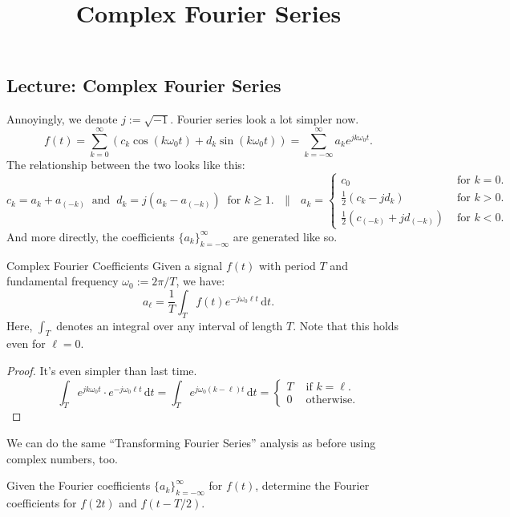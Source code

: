 \title{Complex Fourier Series}



\subsection{Lecture: Complex Fourier Series}

Annoyingly, we denote $j := \sqrt{-1}$.  Fourier series look a lot simpler now.
\[ f(t) = \sum_{k = 0}^{\infty} \left( c_k \cos(k \omega_0 t) + d_k \sin(k \omega_0 t) \right)
= \sum_{k = -\infty}^{\infty} a_k e^{j k \omega_0t}. \]
The relationship between the two looks like this:
\[ c_k = a_k + a_{(-k)} ~ \text{ and } ~ d_k = j\left(a_k - a_{(-k)}\right) ~ \text{ for } k \geq 1. ~~~ \parallel ~~~
a_k = \begin{cases}
c_0 & \text{ for } k = 0. \\
\frac{1}{2}(c_k - jd_k) & \text{ for } k > 0. \\
\frac{1}{2}(c_{(-k)} + jd_{(-k)}) & \text{ for } k < 0.
\end{cases}
\]
And more directly, the coefficients $\{a_k\}_{k = -\infty}^{\infty}$ are generated like so.

\begin{theorem}{Complex Fourier Coefficients}
    Given a signal $f(t)$ with period $T$
    and fundamental frequency $\omega_0 := 2\pi / T$, we have:
    \[ a_{\ell} = \dfrac{1}{T} \int_T f(t) e^{-j \omega_0 \ell t} \, \mathrm{d}t. \]
    Here, $\int_T$ denotes an integral over any interval of length $T$.
    Note that this holds even for $\ell = 0$.
\end{theorem}

\begin{proof}
    It's even simpler than last time.
    \[ \int_T e^{j k \omega_0 t} \cdot e^{-j\omega_0 \ell t} \, \mathrm{d}t
    = \int_T e^{j \omega_0 (k - \ell) t} \, \mathrm{d}t = \begin{cases}
    T & \text{ if } k = \ell. \\
    0 & \text{ otherwise.}
    \end{cases} \]
\end{proof}

We can do the same ``Transforming Fourier Series'' analysis as before using complex numbers, too.

\begin{problem}
    Given the Fourier coefficients $\{a_k\}_{k = -\infty}^{\infty}$ for $f(t)$, determine
    the Fourier coefficients for $f(2t)$ and $f(t - T/2)$.
\end{problem}

